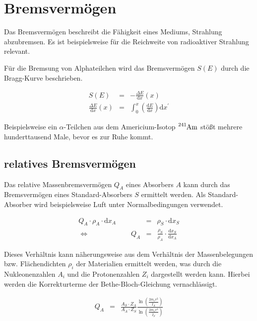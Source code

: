 \documentclass[12pt,a4paper]{scrartcl}
\numberwithin{equation}{section} %
\renewcommand{\[}{} %
\renewcommand{\]}{\noindent} %
\begin{document}
\hypertarget{bremsvermuxf6gen}{%
\section{Bremsvermögen}\label{bremsvermuxf6gen}}

Das Bremsvermögen beschreibt die Fähigkeit eines Mediums, Strahlung
abzubremsen. Es ist beispielsweise für die Reichweite von radioaktiver
Strahlung relevant.

Für die Bremsung von Alphateilchen wird das Bremsvermögen $S(E)$ durch
die Bragg-Kurve beschrieben.

\[
\begin{eqnarray}
    S(E) &=& - \frac{\Delta E}{\mathrm dx}(x) \\
        \frac{\Delta E}{\mathrm dx}(x) &=&
                \int_0^x \left(\frac{\mathrm dE}{\mathrm dx}\right) \mathrm dx^\prime
\end{eqnarray}
\]

Beispielsweise ein $\alpha$-Teilchen aus dem Americium-Isotop
$\ce{^{241}Am}$ stößt mehrere hunderttausend Male, bevor es zur Ruhe
kommt.

\hypertarget{relatives-bremsvermuxf6gen}{%
\subsection{relatives Bremsvermögen}\label{relatives-bremsvermuxf6gen}}

Das relative Massenbremsvermögen $Q_A$ eines Absorbers $A$ kann
durch das Bremsvermögen eines Standard-Absorbers $S$ ermittelt werden.
Als Standard-Absorber wird beispielsweise Luft unter Normalbedingungen
verwendet.

\[
\begin{eqnarray}
        Q_A \cdot \rho_A \cdot \mathrm dx_A
                &=& \rho_S \cdot \mathrm dx_S \\
        \Leftrightarrow \qquad\qquad\qquad Q_A
                &=& \frac{\rho_S}{\rho_A}
                        \cdot \frac{\mathrm dx_S}{\mathrm dx_A}
\end{eqnarray}
\]

Dieses Verhältnis kann näherungsweise aus dem Verhältnis der
Massenbelegungen bzw. Flächendichten $\rho_i$ der Materialien
ermittelt werden, was durch die Nukleonenzahlen $A_i$ und die
Protonenzahlen $Z_i$ dargestellt werden kann. Hierbei werden die
Korrekturterme der Bethe-Bloch-Gleichung vernachlässigt.

\[
\begin{eqnarray}
        Q_A &=& \frac{A_S\cdot Z_A}{A_A\cdot Z_S}
                \frac{\ln\left(\frac{2m_ev^2}{\bar I_A}\right)}{\ln\left(\frac{2m_ev^2}{\bar I_S}\right)}
\end{eqnarray}
\]
\end{document}
